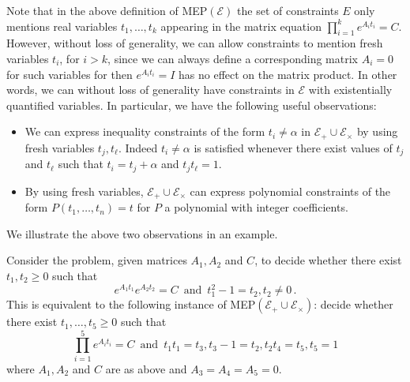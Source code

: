 Note that in the above definition of MEP$(\mathcal{E})$ the set of
constraints $E$ only mentions real variables $t_1,\ldots,t_k$
appearing in the matrix equation $\prod_{i=1}^{k} e^{A_{i} t_{i}}=C$.
However, without loss of generality, we can allow constraints to
mention fresh variables $t_{i}$, for $i>k$, since we can always define a
corresponding matrix $A_i=0$ for such variables for then
$e^{A_{i} t_{i}}=I$ has no effect on the matrix product.  In other words,
we can without loss of generality have constraints in $\mathcal{E}$ with existentially
quantified variables.  In particular, we have the following
useful observations:

\begin{itemize}
\item[\textbullet] We can express inequality constraints of the form
  $t_{i}\neq \alpha$ in  $\mathcal{E}_{+}\cup \mathcal{E}_{\times}$ by
using fresh variables
  $t_{j},t_{\ell}$.  Indeed $t_{i} \neq \alpha$ is satisfied whenever there
  exist values of $t_{j}$ and $t_{\ell}$ such that $t_{i}=t_{j}+\alpha$ and
  $t_{j} t_{\ell}=1$.

\item[\textbullet] By using fresh variables,
  $\mathcal{E}_{+}\cup \mathcal{E}_{\times}$ can express polynomial
  constraints of the form $P(t_1,\ldots,t_n)=t$ for $P$ a polynomial
  with integer coefficients.
\end{itemize}

We illustrate the above two observations in an example.
\begin{example}
  Consider the problem, given matrices $A_1,A_2$ and $C$, to decide
  whether there exist $t_1,t_2 \geq 0$ such that
  \[ e^{A_1t_1}e^{A_2t_2}=C \,\mbox{ and }\, t_1^2-1=t_2, t_2\neq 0 \, .\]
  This is equivalent to the following instance of
  MEP$(\mathcal{E}_{+}\cup\mathcal{E}_{\times})$: decide whether there exist $t_1,\ldots,t_5\geq 0$ such that
\[ \prod_{i=1}^5 e^{A_{i} t_{i}}=C \,\mbox{ and }\, t_1t_1=t_3, t_3-1=t_2, t_2t_4=t_5, t_5=1\]
where $A_1,A_2$ and $C$ are as above and $A_3=A_4=A_5=0$.
\end{example}


